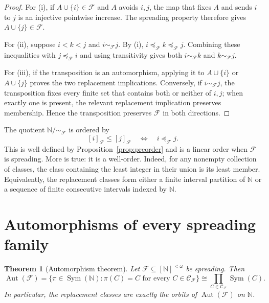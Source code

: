 \documentclass[11pt]{article}
\newtheorem{theorem}{Theorem}[section]
\theoremstyle{definition}
\theoremstyle{remark}
\newcommand{\N}{\mathbb N}
\newcommand{\F}{\mathcal F}
\newcommand{\Ccal}{\mathcal C}
\newcommand{\Aut}{\operatorname{Aut}}
\newcommand{\Sym}{\operatorname{Sym}}
\begin{document}
\begin{proof}
For (i), if $A\cup\{i\}\in\F$ and $A$ avoids $i,j$, the map that fixes $A$
and sends $i$ to $j$ is an injective pointwise increase.  The spreading
property therefore gives $A\cup\{j\}\in\F$.

For (ii), suppose $i<k<j$ and $i\sim_{\F}j$.  By (i),
$i\preccurlyeq_{\F}k\preccurlyeq_{\F}j$.  Combining these inequalities with
$j\preccurlyeq_{\F}i$ and using transitivity gives both
$i\sim_{\F}k$ and $k\sim_{\F}j$.

For (iii), if the transposition is an automorphism, applying it to
$A\cup\{i\}$ or $A\cup\{j\}$ proves the two replacement implications.
Conversely, if $i\sim_{\F}j$, the transposition fixes every finite set that
contains both or neither of $i,j$; when exactly one is present, the relevant
replacement implication preserves membership.  Hence the transposition
preserves $\F$ in both directions.
\end{proof}

The quotient $\N/{\sim_{\F}}$ is ordered by
\[
  [i]_{\F}\le [j]_{\F}
  \quad\Longleftrightarrow\quad i\preccurlyeq_{\F}j.
  \tag{2.3}\label{eq:quotient-order}
\]
This is well defined by Proposition~\ref{prop:preorder} and is a linear order
when $\F$ is spreading.  More is true: it is a well-order.  Indeed, for any
nonempty collection of classes, the class containing the least integer in
their union is its least member.  Equivalently, the replacement classes form
either a finite interval partition of $\N$ or a sequence of finite consecutive
intervals indexed by $\N$.

\section{Automorphisms of every spreading family}

\begin{theorem}[Automorphism theorem]\label{thm:aut}
Let $\F\subseteq[\N]^{<\omega}$ be spreading.  Then
\[
  \Aut(\F)
  =\bigl\{\pi\in\Sym(\N):\pi(C)=C
       \text{ for every }C\in\Ccal_{\F}\bigr\}
  \cong\prod_{C\in\Ccal_{\F}}\Sym(C).
  \tag{3.1}\label{eq:aut-product}
\]
In particular, the replacement classes are exactly the orbits of
$\Aut(\F)$ on $\N$.
\end{theorem}
\end{document}
